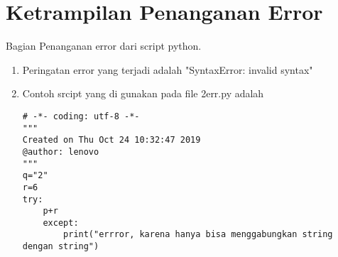 \section{Ketrampilan Penanganan Error}
Bagian Penanganan error dari script python.
\begin{enumerate}
\item
Peringatan error yang terjadi adalah "SyntaxError: invalid syntax"
\item
Contoh srcipt yang di gunakan pada file 2err.py adalah
\begin{verbatim}
# -*- coding: utf-8 -*-
"""
Created on Thu Oct 24 10:32:47 2019
@author: lenovo
"""
q="2"
r=6
try:
    p+r
    except:
        print("errror, karena hanya bisa menggabungkan string dengan string")
\end{verbatim}
\end{enumerate}

